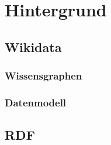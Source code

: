 %
\chapter{Hintergrund}
\label{sec:concepts}

\section{Wikidata}
\cite{wikidata}

\subsection{Wissensgraphen}
\subsection{Datenmodell}

\section{RDF}
\cite{rdf-dump-format}
